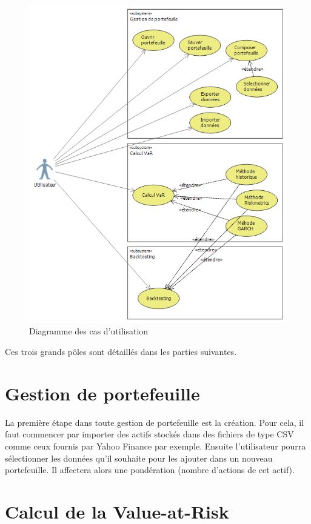 \documentclass[a4paper]{report}
\begin{document}
\begin{figure}[h]
 	\center
  	\includegraphics[scale=0.8]{UseCaseConception.png}
  	\caption{Diagramme des cas d'utilisation}
	\label{fig:usecase}
\end{figure}

Ces trois grands pôles sont détaillés dans les parties suivantes.


\section{Gestion de portefeuille}

La première étape dans toute gestion de portefeuille est la création.
Pour cela, il faut commencer par importer des actifs stockés dans des fichiers de type CSV comme ceux fournis par Yahoo Finance par exemple.
Ensuite l'utilisateur pourra sélectionner les données qu'il souhaite pour les ajouter dans un nouveau portefeuille. Il affectera alors une pondération (nombre d'actions de cet actif).


\section{Calcul de la Value-at-Risk}
\end{document}
